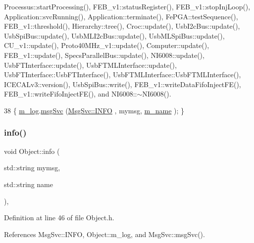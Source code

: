 Processus\+::start\+Processing(), F\+E\+B\+\_\+v1\+::status\+Register(), F\+E\+B\+\_\+v1\+::stop\+Inj\+Loop(), Application\+::svc\+Running(), Application\+::terminate(), Fe\+P\+G\+A\+::test\+Sequence(), F\+E\+B\+\_\+v1\+::threshold(), Hierarchy\+::tree(), Croc\+::update(), Usb\+I2c\+Bus\+::update(), Usb\+Spi\+Bus\+::update(), Usb\+M\+L\+I2c\+Bus\+::update(), Usb\+M\+L\+Spi\+Bus\+::update(), C\+U\+\_\+v1\+::update(), Proto40\+M\+Hz\+\_\+v1\+::update(), Computer\+::update(), F\+E\+B\+\_\+v1\+::update(), Specs\+Parallel\+Bus\+::update(), N\+I6008\+::update(), Usb\+F\+T\+Interface\+::update(), Usb\+F\+T\+M\+L\+Interface\+::update(), Usb\+F\+T\+Interface\+::\+Usb\+F\+T\+Interface(), Usb\+F\+T\+M\+L\+Interface\+::\+Usb\+F\+T\+M\+L\+Interface(), I\+C\+E\+C\+A\+Lv3\+::version(), Usb\+Spi\+Bus\+::write(), F\+E\+B\+\_\+v1\+::write\+Data\+Fifo\+Inject\+F\+E(), F\+E\+B\+\_\+v1\+::write\+Fifo\+Inject\+F\+E(), and N\+I6008\+::$\sim$\+N\+I6008().


\begin{DoxyCode}
38 \{ \hyperlink{classObject_a0d269813dd7ac1f24bc143031e2963f2}{m\_log}.\hyperlink{classMsgSvc_ad25f18047920cc59a314e5098259711c}{msgSvc} (\hyperlink{classMsgSvc_ae671eb7301996cd049d2da8a65925926ad2fcf3f3e734fc41ee097cc23670ce51}{MsgSvc::INFO}    , mymsg, \hyperlink{classObject_a8b83c95c705d2c3ba0d081fe1710f48d}{m\_name} ); \}
\end{DoxyCode}
\mbox{\label{classObject_a1ca123253dfd30fc28b156f521dcbdae}} 
\subsubsection{\texorpdfstring{info()}{info()}\hspace{0.1cm}{\footnotesize\ttfamily [2/2]}}
{\footnotesize\ttfamily void Object\+::info (\begin{DoxyParamCaption}\item[{std\+::string}]{mymsg,  }\item[{std\+::string}]{name }\end{DoxyParamCaption})\hspace{0.3cm}{\ttfamily [inline]}, {\ttfamily [inherited]}}



Definition at line 46 of file Object.\+h.



References Msg\+Svc\+::\+I\+N\+FO, Object\+::m\+\_\+log, and Msg\+Svc\+::msg\+Svc().



